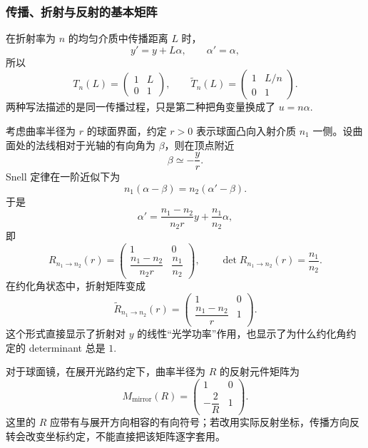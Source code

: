 \subsubsection{传播、折射与反射的基本矩阵}

在折射率为 \(n\) 的均匀介质中传播距离 \(L\) 时，
\begin{equation}
	y'=y+L\alpha,\qquad \alpha'=\alpha,
\end{equation}
所以
\begin{equation}
	T_n(L)=
	\begin{pmatrix}
		1&L\\0&1
	\end{pmatrix},
\qquad
\widetilde T_n(L)=
	\begin{pmatrix}
		1&L/n\\0&1
	\end{pmatrix}.
\end{equation}
两种写法描述的是同一传播过程，只是第二种把角变量换成了 \(u=n\alpha\).

考虑曲率半径为 \(r\) 的球面界面，约定 \(r>0\) 表示球面凸向入射介质 \(n_1\) 一侧。设曲面处的法线相对于光轴的有向角为 \(\beta\)，则在顶点附近
\begin{equation}
	\beta\simeq-\frac{y}{r}.
\end{equation}
Snell 定律在一阶近似下为
\begin{equation}
	n_1(\alpha-\beta)=n_2(\alpha'-\beta).
\end{equation}
于是
\begin{equation}
	\alpha'=\frac{n_1-n_2}{n_2r}y+\frac{n_1}{n_2}\alpha,
\end{equation}
即
\begin{equation}
	R_{n_1\to n_2}(r)=
	\begin{pmatrix}
		1&0\\[2pt]
		\dfrac{n_1-n_2}{n_2r}&\dfrac{n_1}{n_2}
	\end{pmatrix},
\qquad
\det R_{n_1\to n_2}(r)=\frac{n_1}{n_2}.
\end{equation}
在约化角状态中，折射矩阵变成
\begin{equation}
	\widetilde R_{n_1\to n_2}(r)=
	\begin{pmatrix}
		1&0\\[2pt]
		\dfrac{n_1-n_2}{r}&1
	\end{pmatrix}.
\end{equation}
这个形式直接显示了折射对 \(y\) 的线性“光学功率”作用，也显示了为什么约化角约定的 determinant 总是 \(1\).

对于球面镜，在展开光路约定下，曲率半径为 \(R\) 的反射元件矩阵为
\begin{equation}
	M_{\mathrm{mirror}}(R)=
	\begin{pmatrix}
		1&0\\[2pt]
		-\dfrac{2}{R}&1
	\end{pmatrix}.
\end{equation}
这里的 \(R\) 应带有与展开方向相容的有向符号；若改用实际反射坐标，传播方向反转会改变坐标约定，不能直接把该矩阵逐字套用。

